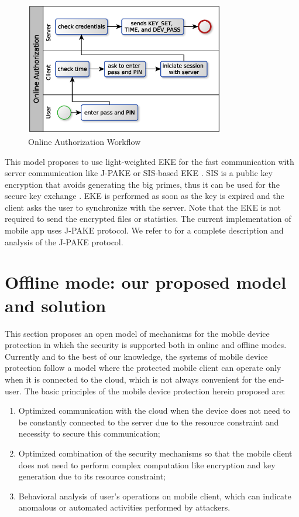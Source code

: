 \documentclass[twocolumn]{svjour3}          %
\begin{document}
\begin{figure}[h!]
	\centering
	\includegraphics[width=8.7cm]{figures/OnlineAuthorizationWorkflow.eps}
	\caption{Online Authorization Workflow}
	\label{fig:4}
\end{figure}

This model proposes to use light-weighted EKE for the fast communication with server communication like J-PAKE \cite{hao2010j, hao2008password} or SIS-based EKE \cite{bogos2013primeless}. SIS is a public key encryption that avoids generating the big primes, thus it can be used for the secure key exchange \cite{bogos2013primeless,bellovin1992encrypted}. EKE is performed as soon as the key is expired and the client asks the user to synchronize with the server. Note that the EKE is not required to send the encrypted files or statistics. The current implementation of mobile app uses J-PAKE protocol. We refer to \cite{hao2010j, hao2008password, toorani2014security} for a complete description and analysis of the J-PAKE protocol.

\section{Offline mode: our proposed model and solution}
\label{sec_offline_mode}
This section proposes an open model of mechanisms for the mobile device protection in which the security is supported both in online and offline modes. Currently and to the best of our knowledge, the systems of mobile device protection follow a model where the protected mobile client can operate only when it is connected to the cloud, which is not always convenient for the end-user. The basic principles of the mobile device protection herein proposed are: 

\begin{enumerate}
	\item Optimized communication with the cloud when the device does not need to be constantly connected to the server due to the resource constraint and necessity to secure this communication;
	\item Optimized combination of the security mechanisms so that the mobile client does not need to perform complex computation like encryption and key generation due to its resource constraint;
	\item Behavioral analysis of user's operations on mobile client, which can indicate anomalous or automated activities performed by attackers.
\end{enumerate}
\end{document}
